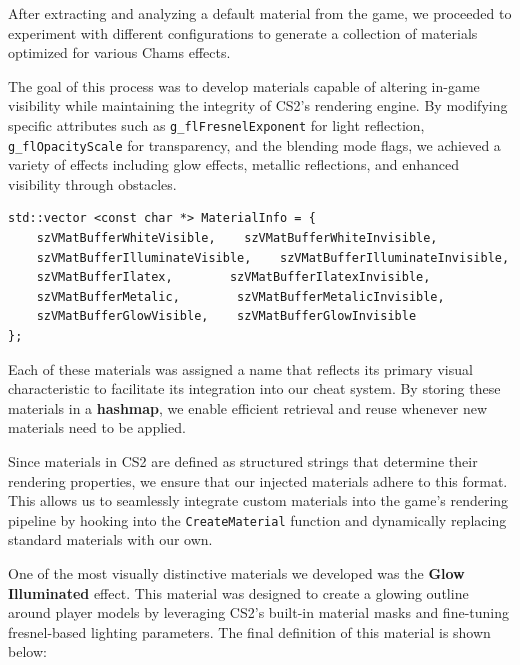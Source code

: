 After extracting and analyzing a default material from the game, we proceeded to experiment with different configurations to generate a collection of materials optimized for various Chams effects.

The goal of this process was to develop materials capable of altering in-game visibility while maintaining the integrity of CS2’s rendering engine. By modifying specific attributes such as \texttt{g\_flFresnelExponent} for light reflection, \texttt{g\_flOpacityScale} for transparency, and the blending mode flags, we achieved a variety of effects including glow effects, metallic reflections, and enhanced visibility through obstacles.

\begin{lstlisting}[style=cppstyle, caption={List of Custom Materials}]
std::vector <const char *> MaterialInfo = { 
    szVMatBufferWhiteVisible,    szVMatBufferWhiteInvisible,
    szVMatBufferIlluminateVisible,    szVMatBufferIlluminateInvisible,
    szVMatBufferIlatex,        szVMatBufferIlatexInvisible,
    szVMatBufferMetalic,        szVMatBufferMetalicInvisible,
    szVMatBufferGlowVisible,    szVMatBufferGlowInvisible
};
\end{lstlisting}

Each of these materials was assigned a name that reflects its primary visual characteristic to facilitate its integration into our cheat system. By storing these materials in a \textbf{hashmap}, we enable efficient retrieval and reuse whenever new materials need to be applied. 

Since materials in CS2 are defined as structured strings that determine their rendering properties, we ensure that our injected materials adhere to this format. This allows us to seamlessly integrate custom materials into the game's rendering pipeline by hooking into the \texttt{CreateMaterial} function and dynamically replacing standard materials with our own.



One of the most visually distinctive materials we developed was the \textbf{Glow Illuminated} effect. This material was designed to create a glowing outline around player models by leveraging CS2’s built-in material masks and fine-tuning fresnel-based lighting parameters. The final definition of this material is shown below:

